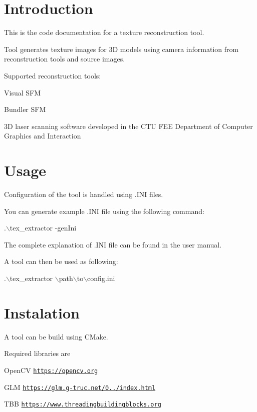 \hypertarget{index_intro_sec}{}\section{Introduction}\label{index_intro_sec}
This is the code documentation for a texture reconstruction tool.

Tool generates texture images for 3\+D models using camera information from reconstruction tools and source images.

Supported reconstruction tools\+:
\begin{DoxyItemize}
\item Visual S\+F\+M
\item Bundler S\+F\+M
\item 3\+D laser scanning software developed in the C\+T\+U F\+E\+E Department of Computer Graphics and Interaction
\end{DoxyItemize}\hypertarget{index_sec_u}{}\section{Usage}\label{index_sec_u}
Configuration of the tool is handled using .I\+N\+I files.

You can generate example .I\+N\+I file using the following command\+: 
\begin{DoxyCode}
.\(\backslash\)tex\_extractor -genIni
\end{DoxyCode}
 The complete explanation of .I\+N\+I file can be found in the user manual.

A tool can then be used as following\+: 
\begin{DoxyCode}
.\(\backslash\)tex\_extractor \(\backslash\)path\(\backslash\)to\(\backslash\)config.ini
\end{DoxyCode}
\hypertarget{index_sec_i}{}\section{Instalation}\label{index_sec_i}
A tool can be build using C\+Make.

Required libraries are
\begin{DoxyItemize}
\item Open\+C\+V \href{https://opencv.org}{\tt https\+://opencv.\+org}
\item G\+L\+M \href{https://glm.g-truc.net/0.9.8/index.html}{\tt https\+://glm.\+g-\/truc.\+net/0../index.\+html}
\item T\+B\+B \href{https://www.threadingbuildingblocks.org}{\tt https\+://www.\+threadingbuildingblocks.\+org} 
\end{DoxyItemize}